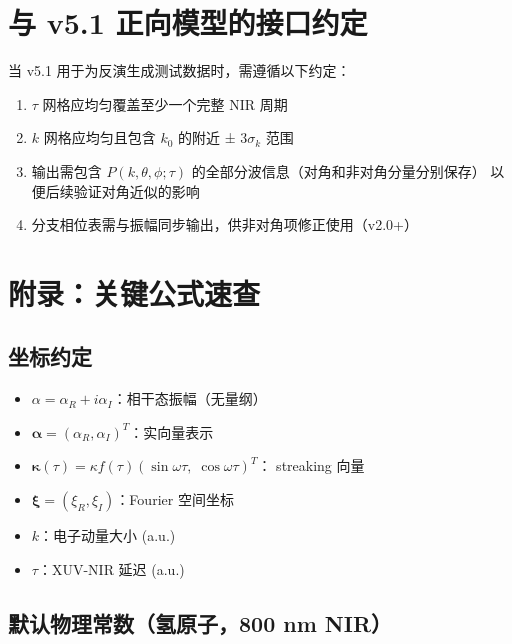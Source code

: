 \documentclass[11pt,a4paper]{ctexart}
\begin{document}
\section{与 v5.1 正向模型的接口约定}

当 v5.1 用于为反演生成测试数据时，需遵循以下约定：

\begin{enumerate}
    \item $\tau$ 网格应均匀覆盖至少一个完整 NIR 周期
    \item $k$ 网格应均匀且包含 $k_0$ 的附近 ± $3\sigma_k$ 范围
    \item 输出需包含 $P(k,\theta,\phi;\tau)$ 的全部分波信息（对角和非对角分量分别保存）
        以便后续验证对角近似的影响
    \item 分支相位表需与振幅同步输出，供非对角项修正使用（v2.0+）
\end{enumerate}

\section{附录：关键公式速查}

\subsection{坐标约定}

\begin{itemize}
    \item $\alpha = \alpha_R + i\alpha_I$：相干态振幅（无量纲）
    \item $\boldsymbol{\alpha} = (\alpha_R, \alpha_I)^T$：实向量表示
    \item $\boldsymbol{\kappa}(\tau) = \kappa f(\tau)(\sin\omega\tau,\;\cos\omega\tau)^T$：
        streaking 向量
    \item $\boldsymbol{\xi} = (\xi_R, \xi_I)$：Fourier 空间坐标
    \item $k$：电子动量大小 (a.u.)
    \item $\tau$：XUV-NIR 延迟 (a.u.)
\end{itemize}

\subsection{默认物理常数（氢原子，800 nm NIR）}
\end{document}
